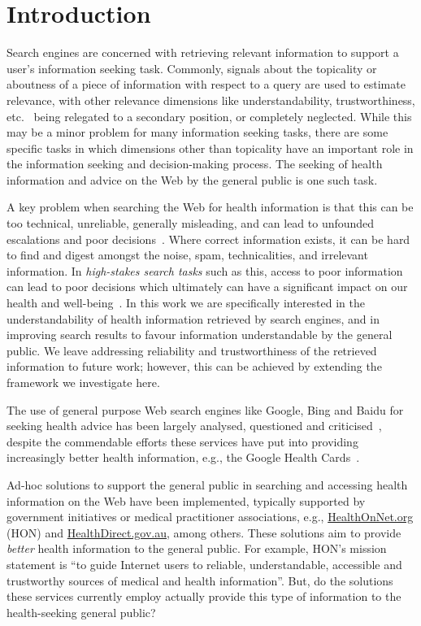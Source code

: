 \section*{Introduction} 
\label{chp:understanding_understandability}

Search engines are concerned with retrieving relevant information to support a user's information seeking task. Commonly, signals about the topicality or aboutness of a piece of information with respect to a query are used to estimate relevance, with other relevance dimensions like understandability, trustworthiness, etc.~\cite{zhang2014multidimensional} being relegated to a secondary position, or completely neglected. While this may be a minor problem for many information seeking tasks, there
are some specific tasks in which dimensions other than topicality have an important role in the information seeking and decision-making process. The seeking of health information and advice on the Web by the general public is one such task. 

A key problem when searching the Web for health information is that this can be too technical, unreliable, generally misleading, and can lead to unfounded escalations and poor decisions~\cite{white09b}. Where correct information exists, it can be hard to find and digest amongst the noise, spam, technicalities, and irrelevant information. In \textit{high-stakes search tasks} such as this, access to poor information can lead to poor decisions which ultimately can have a significant impact on our
health and well-being~\cite{white09b,white13}. In this work we are specifically interested in the understandability of health information retrieved by search engines, and in improving search results to favour information understandable by the general public. We leave addressing reliability and trustworthiness of the retrieved information to future work; however, this can be achieved by extending the framework we investigate here.

The use of general purpose Web search engines like Google, Bing and Baidu for seeking health advice has been largely analysed, questioned and criticised~\cite{graber99,fitzsimmons10,wiener13,patel13,meillier17,ellimoottil12}, despite the commendable efforts these services have put into providing increasingly better health information, e.g., the Google Health Cards~\cite{gabrilovich2016cura}. 

Ad-hoc solutions to support the general public in searching and accessing health information on the Web have been implemented, typically supported by government initiatives or medical practitioner associations, e.g., \url{HealthOnNet.org} (HON) and \url{HealthDirect.gov.au}, among others. 
These solutions aim to provide \textit{better} health information to the general public. For example, HON's mission statement is ``to guide Internet users to reliable, understandable, accessible and
trustworthy sources of medical and health information''. 
But, do the solutions these services currently employ actually provide this type of information to the health-seeking general public? 

